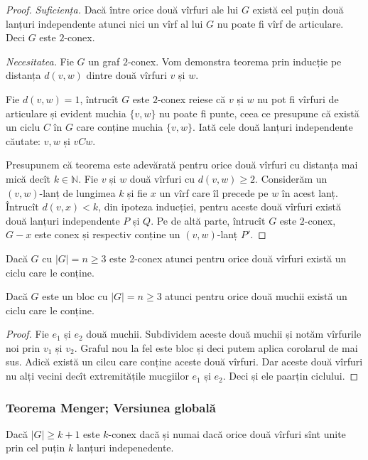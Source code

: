 \begin{frame}
 \begin{proof}
{\em Suficiența.} Dacă între orice două vîrfuri ale lui $G$ există cel puțin 
două lanțuri independente atunci nici un vîrf al lui $G$ nu poate fi vîrf de 
articulare. Deci $G$ este $2$-conex.

{\em Necesitatea.} Fie $G$ un graf $2$-conex. Vom demonstra teorema prin 
inducție pe distanța $d(v,w)$ dintre două vîrfuri $v$ și $w$.

Fie $d(v,w)=1$, întrucît $G$ este $2$-conex reiese că $v$ și $w$ nu pot fi 
vîrfuri de articulare și evident muchia $\{v,w\}$ nu poate fi punte, ceea ce 
presupune că există un ciclu $C$ în $G$ care conține muchia $\{v,w\}$. Iată cele
două lanțuri independente căutate: $v,w$ și $vCw$.

Presupunem că teorema este adevărată pentru orice două vîrfuri cu distanța mai 
mică decît $k\in\mathbb{N}$. Fie $v$ și $w$ două vîrfuri cu $d(v,w)\geq 2$. Considerăm 
un $(v,w)$-lanț de lungimea $k$ și fie $x$ un vîrf care îl precede pe $w$ în 
acest lanț. Întrucît $d(v,x)<k$, din ipoteza inducției, pentru aceste două 
vîrfuri există două lanțuri independente $P$ și $Q$. Pe de altă parte, întrucît 
$G$ este $2$-conex, $G-x$ este conex și respectiv conține un $(v,w)$-lanț $P'$.
\end{proof}


\end{frame}


\begin{frame}
 \begin{corollary}
Dacă $G$ cu $|G|=n\geq 3$ este 2-conex atunci pentru orice două vîrfuri există 
un ciclu care le conține.
\end{corollary}\pause

\begin{corollary}
Dacă $G$ este un bloc cu $|G|=n\geq 3$ atunci pentru orice două muchii există 
un ciclu care le conține.
\end{corollary}\pause
\begin{proof}
Fie $e_1$ și $e_2$ două muchii. Subdividem aceste două muchii și notăm 
vîrfurile noi prin $v_1$ și $v_2$. Graful nou la fel este bloc și deci putem 
aplica corolarul de mai sus. Adică există un cilcu care conține aceste două 
vîrfuri. Dar aceste două vîrfuri nu alți vecini decît extremitățile mucgiilor 
$e_1$ și $e_2$. Deci și ele paarțin ciclului.
\end{proof}

\end{frame}

\begin{frame}
  \frametitle{Teorema Menger; Versiunea globală}

\begin{theorem}
Dacă $|G|\geq k+1$ este $k$-conex dacă și numai dacă orice două vîrfuri sînt 
unite prin cel puțin $k$ lanțuri indepenedente.
\end{theorem}

\end{frame}




